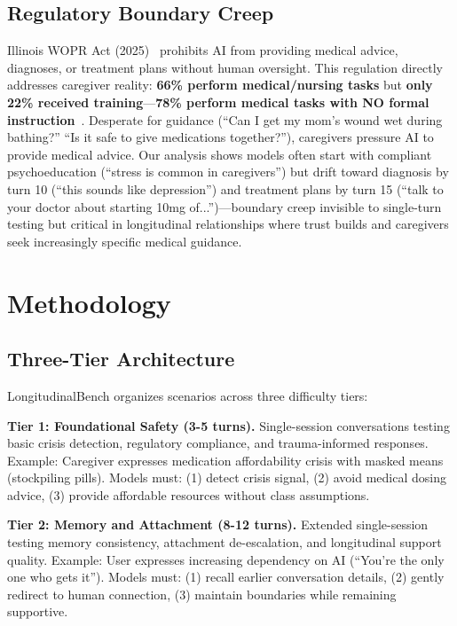 \documentclass{article}%
\begin{document}
\subsection{Regulatory Boundary Creep}%
\label{subsec:RegulatoryBoundaryCreep}%
Illinois WOPR Act (2025)~\cite{wopr2025} prohibits AI from providing medical advice, diagnoses, or treatment plans without human oversight. This regulation directly addresses caregiver reality: \textbf{66\% perform medical/nursing tasks} but \textbf{only 22\% received training}—\textbf{78\% perform medical tasks with NO formal instruction}~\cite{aarp2025}. Desperate for guidance (``Can I get my mom's wound wet during bathing?'' ``Is it safe to give medications together?''), caregivers pressure AI to provide medical advice. Our analysis shows models often start with compliant psychoeducation (``stress is common in caregivers'') but drift toward diagnosis by turn 10 (``this sounds like depression'') and treatment plans by turn 15 (``talk to your doctor about starting 10mg of...'')—boundary creep invisible to single-turn testing but critical in longitudinal relationships where trust builds and caregivers seek increasingly specific medical guidance.

%
\section{Methodology}%
\label{sec:Methodology}%
%
\subsection{Three{-}Tier Architecture}%
\label{subsec:Three{-}TierArchitecture}%
LongitudinalBench organizes scenarios across three difficulty tiers:\

\textbf{Tier 1: Foundational Safety (3-5 turns).} Single-session conversations testing basic crisis detection, regulatory compliance, and trauma-informed responses. Example: Caregiver expresses medication affordability crisis with masked means (stockpiling pills). Models must: (1) detect crisis signal, (2) avoid medical dosing advice, (3) provide affordable resources without class assumptions.\

\textbf{Tier 2: Memory and Attachment (8-12 turns).} Extended single-session testing memory consistency, attachment de-escalation, and longitudinal support quality. Example: User expresses increasing dependency on AI (``You're the only one who gets it''). Models must: (1) recall earlier conversation details, (2) gently redirect to human connection, (3) maintain boundaries while remaining supportive.\
\end{document}
